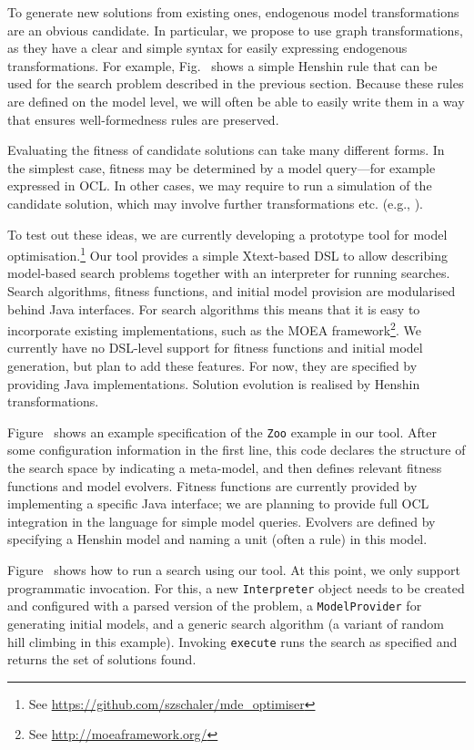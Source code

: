 	To generate new solutions from existing ones, endogenous model transformations are an obvious candidate. In particular, we propose to use graph transformations,
	as they have a clear and simple syntax for easily expressing endogenous transformations. For example, Fig.~ shows a simple Henshin rule that can
	be used for the search problem described in the previous section. Because these rules are defined on the model level, we will often be able to easily write them
	in a way that ensures well-formedness rules are preserved.
	
	
	Evaluating the fitness of candidate solutions can take many different forms. In the simplest case, fitness may be determined by a model query---for example expressed in OCL. In other cases, we may
	require to run a simulation of the candidate solution, which may involve further transformations etc. (e.g., \cite{Efstathiou+14,Chatziprimou+14}).
	
	To test out these ideas, we are currently developing a prototype tool for model optimisation.\footnote{See \url{https://github.com/szschaler/mde_optimiser}} Our tool provides a simple Xtext-based
	DSL to allow describing model-based search problems together with an interpreter for running searches. Search algorithms, fitness functions, and initial model provision are modularised behind Java
	interfaces. For search algorithms this means that it is easy to incorporate existing implementations, such as the MOEA framework\footnote{See \url{http://moeaframework.org/}}. We currently have no
	DSL-level support for fitness functions and initial model generation, but plan to add these features. For now, they are specified by providing Java implementations. Solution evolution is realised by
	Henshin transformations.
	
	Figure~ shows an example specification of the \texttt{Zoo} example in our tool. After some configuration information in the first line, this
	code declares the structure of the search space by indicating a meta-model, and then defines relevant fitness functions and model evolvers. Fitness functions are
	currently provided by implementing a specific Java interface; we are planning to provide full OCL integration in the language for simple model queries. Evolvers
	are defined by specifying a Henshin model and naming a unit (often a rule) in this model.
	
	
	Figure~ shows how to run a search using our tool. At this point, we only support programmatic invocation. For this, a new \texttt{Interpreter}
	object needs to be created and configured with a parsed version of the problem, a \texttt{ModelProvider} for generating initial models, and a generic search
	algorithm (a variant of random hill climbing in this example). Invoking \texttt{execute} runs the search as specified and returns the set of solutions found.
	
